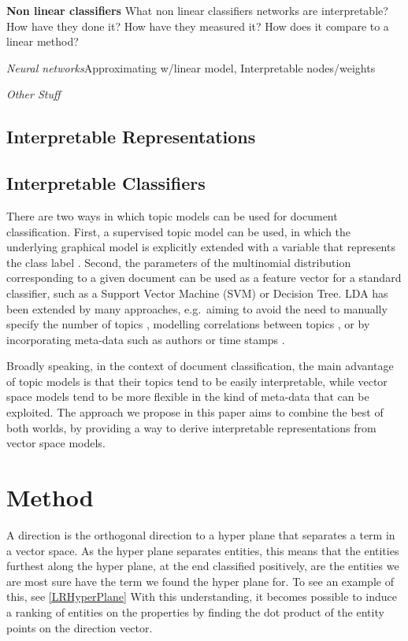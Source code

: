 \textbf{Non linear classifiers}
What non linear classifiers networks are interpretable? How have they done it? How have they measured it? How does it compare to a linear method?

\textit {Neural networks}Approximating w/linear model, Interpretable nodes/weights

\textit {Other Stuff}

\subsection{Interpretable Representations}


\subsection{Interpretable Classifiers}


There are two ways in which topic models can be used for document classification. First, a supervised topic model can be used, in which the underlying graphical model is explicitly extended with a variable that represents the class label \cite{Blei2010}. Second, the parameters of the multinomial distribution corresponding to a given document can be used as a feature vector for a standard classifier, such as a Support Vector Machine (SVM) or Decision Tree. LDA has been extended by many approaches, e.g.\ aiming to avoid the need to manually specify the number of topics \cite{teh2005sharing}, modelling correlations between topics \cite{Blei2006}, or by incorporating meta-data such as authors \cite{rosen2004author} or time stamps \cite{wang2006topics}.



Broadly speaking, in the context of document classification, the main advantage of topic models is that their topics tend to be easily interpretable, while vector space models tend to be more flexible in the kind of meta-data that can be exploited. The approach we propose in this paper aims to combine the best of both worlds, by providing a way to derive interpretable representations from vector space models.



\section{Method}
A direction is the orthogonal direction to a hyper plane that separates a term in a vector space. As the hyper plane separates entities, this means that the entities furthest along the hyper plane, at the end classified positively, are the entities we are most sure have the term we found the hyper plane for. To see an example of this, see \ref {LRHyperPlane} With this understanding, it becomes possible to induce a ranking of entities on the properties by finding the dot product of the entity points on the direction vector.

